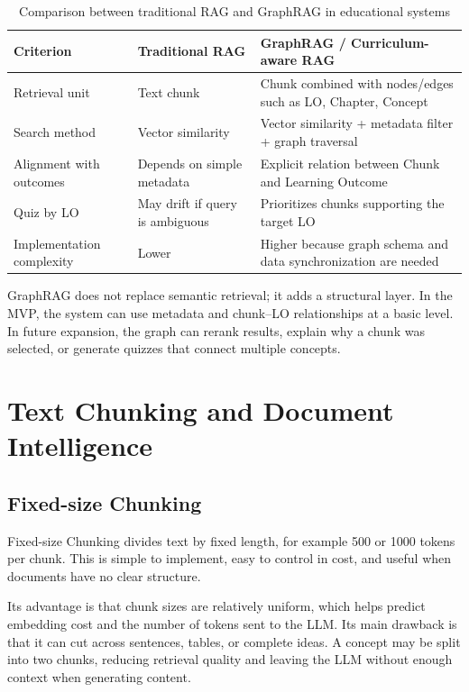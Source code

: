 \begin{table}[H]
    \centering
    \caption{Comparison between traditional RAG and GraphRAG in educational systems}
    \label{tab:rag-vs-graphrag-c3}
    \begin{tabular}{p{3.8cm}p{4.8cm}p{5.2cm}}
        \toprule
        \textbf{Criterion} & \textbf{Traditional RAG} & \textbf{GraphRAG / Curriculum-aware RAG} \\
        \midrule
        Retrieval unit & Text chunk & Chunk combined with nodes/edges such as LO, Chapter, Concept \\
        Search method & Vector similarity & Vector similarity + metadata filter + graph traversal \\
        Alignment with outcomes & Depends on simple metadata & Explicit relation between Chunk and Learning Outcome \\
        Quiz by LO & May drift if query is ambiguous & Prioritizes chunks supporting the target LO \\
        Implementation complexity & Lower & Higher because graph schema and data synchronization are needed \\
        \bottomrule
    \end{tabular}
\end{table}

GraphRAG does not replace semantic retrieval; it adds a structural layer.
In the MVP, the system can use metadata and chunk--LO relationships at a
basic level. In future expansion, the graph can rerank results, explain
why a chunk was selected, or generate quizzes that connect multiple
concepts.

\section{Text Chunking and Document Intelligence}
\label{sec:text-chunking-document-intelligence}

\subsection{Fixed-size Chunking}
\label{subsec:fixed-size-chunking}

Fixed-size Chunking divides text by fixed length, for example 500 or 1000
tokens per chunk. This is simple to implement, easy to control in cost,
and useful when documents have no clear structure.

Its advantage is that chunk sizes are relatively uniform, which helps
predict embedding cost and the number of tokens sent to the LLM. Its main
drawback is that it can cut across sentences, tables, or complete ideas.
A concept may be split into two chunks, reducing retrieval quality and
leaving the LLM without enough context when generating content.

